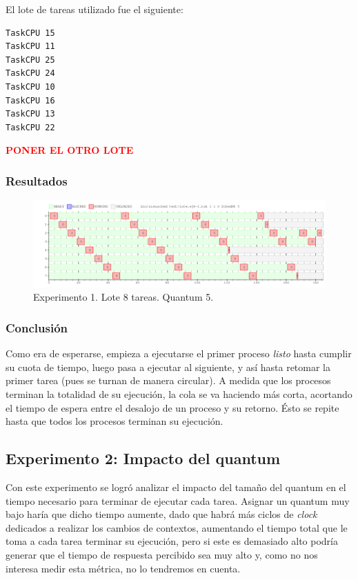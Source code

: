 \documentclass[a4paper]{article}
\begin{document}
El lote de tareas utilizado fue el siguiente:

\begin{verbatim}
TaskCPU 15
TaskCPU 11
TaskCPU 25
TaskCPU 24
TaskCPU 10
TaskCPU 16
TaskCPU 13
TaskCPU 22
\end{verbatim}

\textbf{\textcolor{red}{PONER EL OTRO LOTE}}

\subsubsection{Resultados}
\begin{figure}[htb]
\begin{center}
\includegraphics[scale=0.4]{imagenes/ej4-1.png}
\end{center}
\caption{Experimento 1. Lote 8 tareas. Quantum 5.}
\end{figure}

\subsubsection{Conclusión}

Como era de esperarse, empieza a ejecutarse el primer proceso \textit{listo}
hasta cumplir su cuota de tiempo, luego pasa a ejecutar al siguiente, y así
hasta retomar la primer tarea (pues se turnan de manera circular). A medida
que los procesos terminan la totalidad de su ejecución, la cola se va
haciendo más corta, acortando el tiempo de espera entre el desalojo de un
proceso y su retorno. Ésto se repite hasta que todos los procesos terminan
su ejecución.

\subsection{Experimento 2: Impacto del quantum}
Con este experimento se logró analizar el impacto del tamaño del quantum en
el tiempo necesario para terminar de ejecutar cada tarea. Asignar un quantum
muy bajo haría que dicho tiempo aumente, dado que habrá más ciclos de
\textit{clock} dedicados a realizar los cambios de contextos, aumentando el
tiempo total que le toma a cada tarea terminar su ejecución, pero si este es
demasiado alto podría generar que el tiempo de respuesta percibido sea muy
alto y, como no nos interesa medir esta métrica, no lo tendremos en cuenta.
\end{document}
